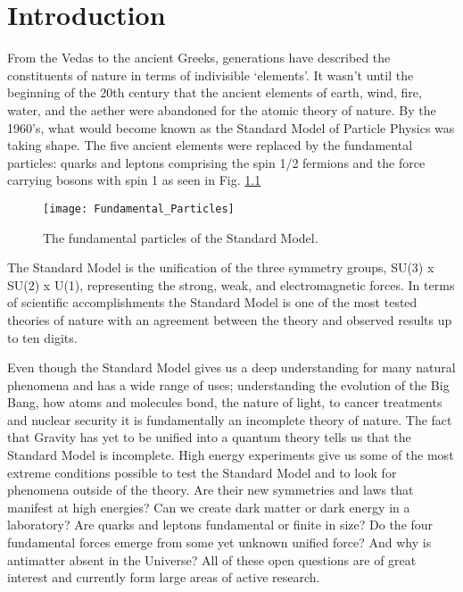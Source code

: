 \chapter{Introduction} \label{ch:introduction}

From the Vedas to the ancient Greeks, generations have described the constituents of nature in terms of indivisible `elements'.  It wasn't until the beginning of the 20th century that the ancient elements of earth, wind, fire, water, and the aether were abandoned for the atomic theory of nature.  By the 1960's, what would become known as the Standard Model of Particle Physics was taking shape.  The five ancient elements were replaced by the fundamental particles: quarks and leptons comprising the spin 1/2 fermions and the force carrying bosons with spin 1 as seen in Fig. \ref{fig:fundpart}
\begin{figure}[h]
\texttt{[image: Fundamental\_Particles]}
\centering
\caption{The fundamental particles of the Standard Model\cite{Patrignani:2016xqp}.}
\label{fig:fundpart}
\end{figure}
\par
The Standard Model is the unification of the three symmetry groups, SU(3) x SU(2) x U(1), representing the strong, weak, and electromagnetic forces\cite{Langacker:2009my}.  In terms of scientific accomplishments the Standard Model is one of the most tested theories of nature with an agreement between the theory and observed results up to ten digits\cite{Aoyama:2014sxa}. 
 
 \noindent
Even though the Standard Model gives us a deep understanding for many natural phenomena and has a wide range of uses; understanding the evolution of the Big Bang, how atoms and molecules bond, the nature of light, to cancer treatments and nuclear security it is fundamentally an incomplete theory of nature.  The fact that Gravity has yet to be unified into a quantum theory tells us that the Standard Model is incomplete.  High energy experiments give us some of the most extreme conditions possible to test the Standard Model and to look for phenomena outside of the theory.  Are their new symmetries and laws that manifest at high energies? Can we create dark matter or dark energy in a laboratory?  Are quarks and leptons fundamental or finite in size?  Do the four fundamental forces emerge from some yet unknown unified force?  And why is antimatter absent in the Universe?  All of these open questions are of great interest and currently form large areas of active research.  

